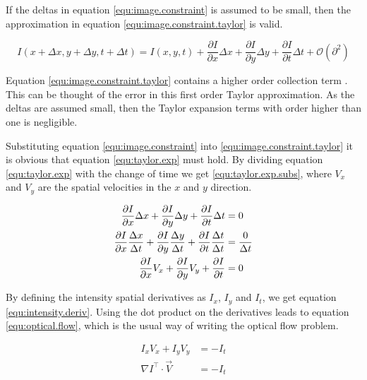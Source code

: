 If the deltas in equation \eqref{equ:image.constraint} is assumed to be small, then the approximation in equation \eqref{equ:image.constraint.taylor} is valid.

\begin{equation}\label{equ:image.constraint.taylor}
	I(x + \Delta x, y+ \Delta y, t + \Delta t) = I(x,y,t) + \frac{\partial I}{\partial x} \Delta x + 
		\frac{\partial I}{\partial y} \Delta y + \frac{\partial I}{\partial t} \Delta t + \mathcal{O}(\partial^2)
\end{equation}

Equation \eqref{equ:image.constraint.taylor} contains a higher order collection term 
. This can be thought of the error in this first order Taylor approximation. As
the deltas are assumed small, then the Taylor expansion terms with order higher than one is negligible. 

Substituting equation \eqref{equ:image.constraint} into \eqref{equ:image.constraint.taylor} it is obvious that equation \eqref{equ:taylor.exp} must hold. 
By dividing equation \eqref{equ:taylor.exp} with the change of time we get \eqref{equ:taylor.exp.subs}, where $V_x$ and $V_y$ are the spatial velocities in the 
$x$ and $y$ direction.

\begin{align}
	\frac{\partial I}{\partial x} \Delta x + \frac{\partial I}{\partial y} \Delta y + 
		\frac{\partial I}{\partial t} \Delta t &= 0 \label{equ:taylor.exp} \\
	\frac{\partial I}{\partial x} \frac{\Delta x}{\Delta t} + \frac{\partial I}{\partial y} \frac{\Delta y}{\Delta t} + 
		\frac{\partial I}{\partial t} \frac{\Delta t}{\Delta t} &= \frac{0}{\Delta t} \notag \\
	\frac{\partial I}{\partial x} V_x + \frac{\partial I}{\partial y} V_y + \frac{\partial I}{\partial t}  &= 0 \label{equ:taylor.exp.subs}
\end{align}

By defining the intensity spatial derivatives as $I_x$, $I_y$ and $I_t$, we get equation \eqref{equ:intensity.deriv}. Using the dot product on the derivatives 
leads to equation \eqref{equ:optical.flow}, which is the usual way of writing the optical flow problem.

\begin{align}
	I_x V_x + I_y V_y &= -I_t \label{equ:intensity.deriv} \\
	\nabla I^\top \cdot \vec{V} &= -I_t \label{equ:optical.flow}
\end{align}


